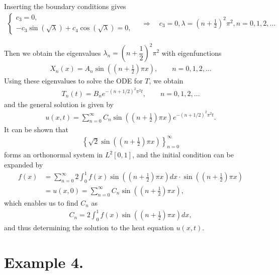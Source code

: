 \documentclass[12pt, a4paper]{article}
\begin{document}
\begin{spacing}{1.1}
\begin{itemize}
	Inserting the boundary conditions gives
	\begin{align*}
	\left\{
	\begin{array}{l}
	c_3 = 0, \\
	-c_3\sin(\sqrt{\lambda}) + c_4\cos(\sqrt{\lambda}) = 0,
	\end{array}
	\right. \quad\Rightarrow\quad c_3 = 0, \lambda = \left(n + \frac{1}{2} \right)^2\pi^2, n = 0, 1, 2, \ldots
	\end{align*}
\end{itemize}
Then we obtain the eigenvalues $\lambda_n = \left(n + \dfrac{1}{2} \right)^2\pi^2$ with eigenfunctions
\begin{align*}
X_n(x) = A_n \sin\left(\left(n + \frac{1}{2} \right)\pi x \right), \qquad n = 0, 1, 2, \ldots
\end{align*}
Using these eigenvalues to solve the ODE for $T$, we obtain
\begin{align*}
T_n(t) = B_n e^{-(n+1/2)^2\pi^2 t}, \qquad n = 0, 1, 2, \ldots
\end{align*}
and the general solution is given by
\begin{align*}
u(x, t) = \sum_{n=0}^{\infty} C_n \sin\left(\left(n + \frac{1}{2} \right)\pi x \right) e^{-(n+1/2)^2\pi^2 t}.
\end{align*}
It can be shown that 
\begin{align*}
\left\{\sqrt{2}\sin\left(\left(n + \frac{1}{2} \right)\pi x \right) \right\}_{n=0}^{\infty}
\end{align*}
forms an orthonormal system in $L^2[0, 1]$, and the initial condition can be expanded by
\begin{align*}
f(x) & = \sum_{n=0}^{\infty} 2\int_{0}^1 f(x)\sin\left(\left(n + \frac{1}{2} \right)\pi x \right) dx \cdot \sin\left(\left(n + \frac{1}{2} \right)\pi x \right) \\
& = u(x, 0) = \sum_{n=0}^{\infty} C_n \sin\left(\left(n + \frac{1}{2} \right)\pi x \right),
\end{align*}
which enables us to find $C_n$ as
\begin{align*}
C_n = 2\int_{0}^1 f(x)\sin\left(\left(n + \frac{1}{2} \right)\pi x \right) dx,
\end{align*}
and thus determining the solution to the heat equation $u(x, t)$.

\section*{Example 4.}


\end{spacing}
\end{document}
